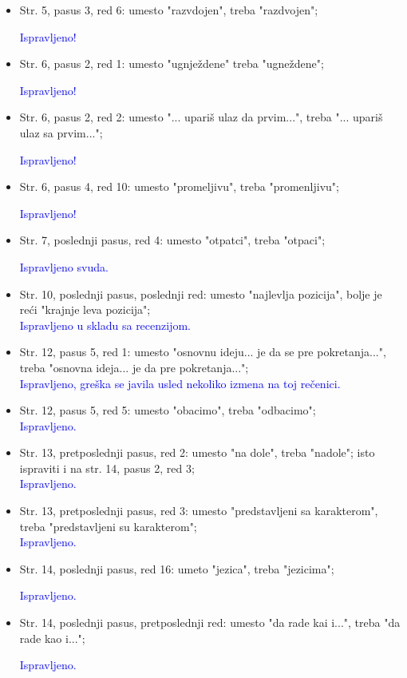\documentclass[a4paper]{report}
\newcommand{\odgovor}[1]{\textcolor{blue}{#1}}
\begin{document}
\begin{itemize}
	\item Str. 5, pasus 3, red 6: umesto "razvdojen", treba "razdvojen";
	
	\odgovor{Ispravljeno!}
	
	\item Str. 6, pasus 2, red 1: umesto "ugnježdene" treba "ugneždene";
	
	\odgovor{Ispravljeno!}
	
	\item Str. 6, pasus 2, red 2: umesto "... upariš ulaz da prvim...", treba "... upariš ulaz sa prvim...";
	
	\odgovor{Ispravljeno!}
	
	\item Str. 6, pasus 4, red 10: umesto "promeljivu", treba "promenljivu";
	
	\odgovor{Ispravljeno!}
	
	\item Str. 7, poslednji pasus, red 4: umesto "otpatci", treba "otpaci";
	
	\odgovor{Ispravljeno svuda.}
	
	\item Str. 10, poslednji pasus, poslednji red: umesto "najlevlja pozicija", bolje je reći "krajnje leva pozicija";\\
	
	\odgovor{Ispravljeno u skladu sa recenzijom.}

	\item Str. 12, pasus 5, red 1: umesto "osnovnu ideju... je da se pre pokretanja...", treba "osnovna ideja... je da pre pokretanja...";\\

	\odgovor{Ispravljeno, greška se javila usled nekoliko izmena na toj rečenici.}

	\item Str. 12, pasus 5, red 5: umesto "obacimo", treba "odbacimo";\\

	\odgovor{Ispravljeno.}

	\item Str. 13, pretposlednji pasus, red 2: umesto "na dole", treba "nadole"; isto ispraviti i na str. 14, pasus 2, red 3;\\

	\odgovor{Ispravljeno.}

	\item Str. 13, pretposlednji pasus, red 3: umesto "predstavljeni sa karakterom", treba "predstavljeni su karakterom";\\

	\odgovor{Ispravljeno.}

	\item Str. 14, poslednji pasus, red 16: umeto "jezica", treba "jezicima";
	
	\odgovor{Ispravljeno.}
	
	\item Str. 14, poslednji pasus, pretposlednji red: umesto "da rade kai i...", treba "da rade kao i...";   
	
	\odgovor{Ispravljeno.}
	   
\end{itemize}
\end{document}
